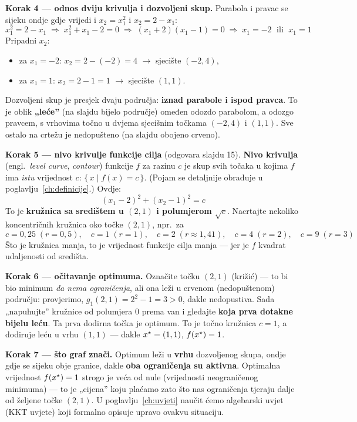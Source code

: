 \begin{crtanje}
\medskip
\textbf{Korak 4 --- odnos dviju krivulja i dozvoljeni skup.}
Parabola i pravac se sijeku ondje gdje vrijedi i $x_2 = x_1^2$ i
$x_2 = 2 - x_1$:
\[
x_1^2 = 2 - x_1 \;\Longrightarrow\; x_1^2 + x_1 - 2 = 0
\;\Longrightarrow\; (x_1 + 2)(x_1 - 1) = 0
\;\Longrightarrow\; x_1 = -2 \;\text{ ili }\; x_1 = 1
\]
Pripadni $x_2$:
\begin{itemize}
  \item za $x_1 = -2$: $x_2 = 2 - (-2) = 4$ $\to$ sjecište $(-2, 4)$,
  \item za $x_1 = 1$: $x_2 = 2 - 1 = 1$ $\to$ sjecište $(1, 1)$.
\end{itemize}
Dozvoljeni skup je presjek dvaju područja: \textbf{iznad parabole i ispod
pravca}. To je oblik \textbf{„leće”} (na slajdu bijelo područje) omeđen odozdo
parabolom, a odozgo pravcem, s vrhovima točno u dvjema sjecišnim točkama
$(-2,4)$ i $(1,1)$. Sve ostalo na crtežu je nedopušteno (na slajdu obojeno
crveno).

\medskip
\textbf{Korak 5 --- nivo krivulje funkcije cilja} (odgovara slajdu 15).
\textbf{Nivo krivulja} (engl.\ \emph{level curve}, \emph{contour}) funkcije $f$
za razinu $c$ je skup svih točaka u kojima $f$ ima \emph{istu} vrijednost $c$:
$\{\, x \mid f(x) = c \,\}$. (Pojam se detaljnije obrađuje u
poglavlju~\ref{ch:definicije}.) Ovdje:
\[
(x_1 - 2)^2 + (x_2 - 1)^2 = c
\]
To je \textbf{kružnica sa središtem u $(2,1)$ i polumjerom $\sqrt{c}$}.
Nacrtajte nekoliko koncentričnih kružnica oko točke $(2,1)$, npr.\ za
\[
c = 0{,}25 \;(r = 0{,}5), \quad c = 1 \;(r = 1), \quad c = 2 \;(r \approx 1{,}41),
\quad c = 4 \;(r = 2), \quad c = 9 \;(r = 3)
\]
Što je kružnica manja, to je vrijednost funkcije cilja manja --- jer je $f$
kvadrat udaljenosti od središta.

\medskip
\textbf{Korak 6 --- očitavanje optimuma.}
Označite točku $(2,1)$ (križić) --- to bi bio minimum \emph{da nema
ograničenja}, ali ona leži u crvenom (nedopuštenom) području: provjerimo,
$g_1(2,1) = 2^2 - 1 = 3 > 0$, dakle nedopustiva. Sada „napuhujte” kružnice od polumjera
$0$ prema van i gledajte \textbf{koja prva dotakne bijelu leću}. Ta prva dodirna
točka je optimum. To je točno kružnica $c = 1$, a dodiruje leću u vrhu $(1,1)$
--- dakle $x^{\star} = (1,1)$, $f(x^{\star}) = 1$.

\medskip
\textbf{Korak 7 --- što graf znači.}
Optimum leži u \textbf{vrhu} dozvoljenog skupa, ondje gdje se sijeku obje
granice, dakle \textbf{oba ograničenja su aktivna}. Optimalna vrijednost
$f(x^{\star}) = 1$ strogo je veća od nule (vrijednosti neograničenog minimuma) ---
to je „cijena” koju plaćamo zato što nas ograničenja tjeraju dalje od željene
točke $(2,1)$. U poglavlju~\ref{ch:uvjeti} naučit ćemo algebarski uvjet (KKT
uvjete) koji formalno opisuje upravo ovakvu situaciju.
\end{crtanje}

